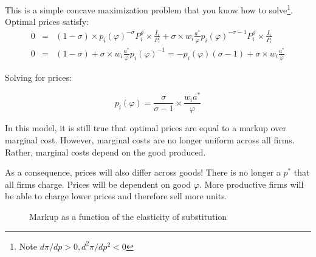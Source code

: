 \documentclass[11pt,letterpaper]{article}
\begin{document}
This is a simple concave maximization problem that you know how to solve\footnote{Note $d \pi / dp > 0, d^2 \pi / dp^2 < 0$}. Optimal prices satisfy:
\begin{eqnarray*}
    0 &=& (1-\sigma)\times p_i(\varphi)^{-\sigma} P_i^{\sigma}  \times \frac{I_i}{P_i} + \sigma \times w_i \frac{a^*}{\varphi} p_i(\varphi)^{-\sigma-1} P_i^{\sigma} \times \frac{I_i}{P_i}  \\
    0 &=& (1-\sigma) + \sigma \times w_i \frac{a^*}{\varphi} p_i(\varphi)^{-1}  = -p_i(\varphi)(\sigma-1) + \sigma \times w_i \frac{a^*}{\varphi}
\end{eqnarray*}

Solving for prices:

\begin{equation*}
    \boxed{
    p_i(\varphi) = \frac{\sigma}{\sigma-1} \times  \frac{w_ia^*}{\varphi} 
    }
\end{equation*}

In this model, it is still true that optimal prices are equal to a markup over marginal cost. However, marginal costs are no longer uniform across all firms. Rather, marginal costs depend on the good produced.

As a consequence, prices will also differ across goods! There is no longer a $p^*$ that all firms charge. Prices will be dependent on good $\varphi$. More productive firms will be able to charge lower prices \textemdash and therefore sell more units.

    \begin{figure}[htp]
        \centering
            \caption{Markup as a function of the elasticity of substitution}
        \label{fig: ces-markup}
    \end{figure}
\end{document}
